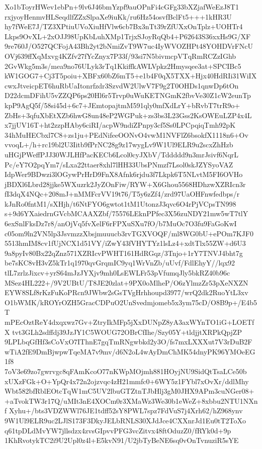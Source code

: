 {{Xo1bToyrHWev1ebPn+9lv6J46bmYzpf9auOPnFi4cGFg33bXZjafWeEzJ8T1
rxjyoyHenmvHLSeqdlfZZxSlpaXe9iuKk/ru6Hz54osvfBclFt5+++1kHR3U
hy7fWeE7J/TZ3XPtiuUVoXiuHfVlw6cb7Bx3nTt39rZfUXxOnTplz+UOHTr4
Lkps9OvXL+2xOJJ98UpKbLuhXMp1TrjxSJoyRqQb4+P62643S36xxHs9G/XF
9re760J/O527QCFojA43Bh2yt2bNmiZvT9W7uc4IyWVOZHPt48YOHDVrFNcU
OVj639ffXqMxvg4KZfv27fYcZnyx7P33f/93si7N5bivmcpVTqRmRCZzIGhb
2GvWkg5m3s/mea9no76ULyk3rTq1KkiffkAWLVpkz2Hmysqee3at+SPCIBc5
kW1GOG7+Cj3T5poiu+XBFx60bZ6mT5+e1b4F0qX5TXX+Hjx40HdRIi31WiIX
cwxJtveicpET6huRbUaItonrfzdr3SzvdW2UlwV7F9g2T0OHDs1qnwDp6tOn
D22dcmDFihU5vZZQP6ps20Hl6r5Trvp0uWuKETNGmK2fbvVe30Z1cW2eunTp
kpP9AgQ5f/58si45d+6c7+JEmtopajtmM591qly0mfXdLrY+bRvbT7trR9o+
ZbHs+3qfuXbEtXZb6hwG8un48eP2WGPuk+zs3bs3L23Gss2KsOWEuLZP4x4L
x7jjUV16T+ht2zzpHAby6ciRI/acpW9ndiZPnpy3cf5Ss0LPCpqiqTmh92pK
34hMuHECbxl7C8+zs1ju+PEdNifeeOONvO4vwM1NVFlZ6bsokfX1118n6+Ov
vvoqL+/h+rc19bl2U3Iitb9fPrNC28g9z17wygLv9W1Ul9ELR9u2scxZhHzb
uHGjPWeffPJJ30WJLHfPacKECb6Lcol0cyJXbV/Tddddd9n3mrJsivf6NqrL
Pc/eY7O2pqYm7/sLxa22ttaer8xhl7lHH33UbsPNmzf7Lsol0skJZYSyoVAZ
IdpWer9BDwzi3lOGywPrHrD9FnX8Afnk6rjdu3f7Lkpk6T5NLvtM5FI6OVHo
jBDXl6Lbrd28jjke5WXuzrk2JyZOnFiw/RYW+X6Ghou5568HDhzwXZRIcn3r
fI3dqX4NQc+208mJ+nMMFcrVV19t76/T5y6zZf4/zrd97UaOHFnwfedbps/r
kJnRo0fntM1/sXHjh/t6NtFYO6gwtot1tM1UtonzJ3qvc6O4rPjVCpsTN998
s+9d6YXaiedrnGVcbMCAAXZbf/75576LEknPPfec3X56zuNDY21mw5wT7tlY
6exSnlFksDz7r8/anOjVq5fvXelF6rFPXuSXu7fO/b7MuOc7O3fu9FaGoKwI
c05om9ln2VN5lp3JsvmzzXbsjmuuucb3rvTGXVOQF/ml8WG0bU+ePOm7KJF0
5513hmIM8cv1fUjNCX1d51VY/iZwY43fVHYTYz1lsLz4+xdtTlx55ZW+d6U3
9a8pyIv80Bx22qZnz571XZRIcvPWHT161HdRGqz/3Tnjo+1rY7TNVJ4bht7g
be7sKC8vH3vZ5kTr1q1970qvGrqmIC9yq1WrVnZb/uUvf/FdlEhyY//lqx92
tlL7zrlzJixcv+yrS64mJzJYXjv9mh0LsEWLFr53pVfumqJly5bkRZ40b96c
MSez4HL222+/9V2UBtU/T8JE20zlat+9PX0oMlheP/O6zYlmzZr53pXeNXZN
EYW8SLf8rKzFuKoPRcn9JWbw2sGsTVgHrhhoupd3977/wrQ2dk2RuoYtL3xv
O1bWMK/kROYrOZH5GracCDPuO2UnSvedmjomeb5x3ym75cD/O8B9p+/E4b5T
mPEcOztReY4dxqxwz7Gv+ZtryIkMFp5jXxDUNpZ8yA3axWYnTO1iG+LOETfX
tvt3GLh2sdffdj39JzJY1C5WOUG72OBrCfIhe/Szy05Y+tldjjtXRPkQpjZP
9LPLbqGfHf3sCoVxO7IThnE7gqTmRNgwbkd2y3O/fs7mxLXXXut7V3rDuB2F
wTiA2fE9DmBjwpwTqeMA7v9mv/d6N2oL4wAyDmChMK54dnyPK96YMOeEG1f8
7oV3e69zo7gwrvgc8qFAmKcoO77nKWpMOjmh881HOyjNU9SidQtTsaLCe50b
xUXzFGk+O+YpQr4x72n2ojzvqc4zH21mmfc0+6WY5z1FYbl7xOvXr/ddlMhy
Wbt582bfRblEOtcTqW1mC5UV2lbuGTZtnTJbHlj3gM0JHX9APm3cuNGer08+
+aTvokTW3r17Q/uMIt3nE4XOCm0r3XMaWz3We30b1eWeZ+8xbbu2NTU1NXnf
Xyhu+/bts3VDZWWl76JE1tdff52sY8PWL7spz7FdVuS7j4Xrh62/hZ968ynv
9W1Ul9ELR9uc2LJlS173F3DkyJELbRNLS30XJdJce4CXXnrJd1Eu0tT2ToXo
q61tpDLdMvYW7jllsdzx4zvsGIpvvPFG3vcZitvx48ftOduzZ0/fRYk0d+9p
1KhRvotykTC2i9U2Upl0z4l+E5kvN91/U2jbTyBeNE6sq0vOnTvnuziR5sYE
}}
